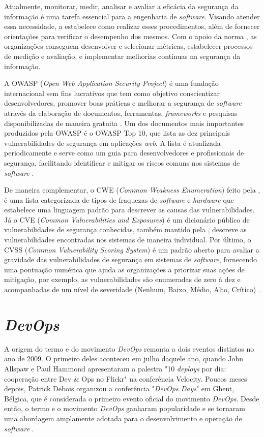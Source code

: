 Atualmente, monitorar, medir, analisar e avaliar a eficácia da segurança da informação é uma tarefa essencial para a engenharia de \textit{software}. Visando atender essa necessidade, a  estabelece como realizar esses procedimentos, além de fornecer orientações para verificar o desempenho dos mesmos. Com o apoio da norma , as organizações conseguem desenvolver e selecionar métricas, estabelecer processos de medição e avaliação, e implementar melhorias contínuas na segurança da informação.

A OWASP (\textit{Open Web Application Security Project}) é uma fundação internacional sem fins lucrativos que tem como objetivo conscientizar desenvolvedores, promover boas práticas e melhorar a segurança de \textit{software} através da elaboração de documentos, ferramentas, \textit{frameworks} e pesquisas disponibilizadas de maneira gratuita \cite{owasp}. Um dos documentos mais importantes produzidos pela OWASP é o OWASP Top 10, que lista as dez principais vulnerabilidades de segurança em aplicações \textit{web}. A lista é atualizada periodicamente e serve como um guia para desenvolvedores e profissionais de segurança, facilitando identificar e mitigar os riscos comuns nos sistemas de \textit{software} \cite{owasptop10_2021}.


De maneira complementar, o CWE (\textit{Common Weakness Enumeration}) feito pela , é uma lista categorizada de tipos de fraquezas de \textit{software} e \textit{hardware} que estabelece uma linguagem padrão para descrever as causas das vulnerabilidades. Já o CVE (\textit{Common Vulnerabilities and Exposures}) é um dicionário público de vulnerabilidades de segurança conhecidas, também mantido pela \cite{CVE}, descreve as vulnerabilidades encontradas nos sistemas de maneira individual. 
Por último, o CVSS (\textit{Common Vulnerability Scoring System}) é um padrão aberto para avaliar a gravidade das vulnerabilidades de segurança em sistemas de \textit{software}, fornecendo uma pontuação numérica que ajuda as organizações a priorizar suas ações de mitigação, por exemplo, as vulnerabilidades são enumeradas de zero à dez e acompanhadas de um nível de severidade (Nenhum, Baixo, Médio, Alto, Crítico) \cite{CVSS}.


\section{\textit{DevOps}}

A origem do termo e do movimento \textit{DevOps} remonta a dois eventos distintos no ano de 2009. O primeiro deles aconteceu em julho daquele ano, quando John Allspaw e Paul Hammond apresentaram a palestra "10 \textit{deploys} por dia: cooperação entre Dev \& Ops no Flickr" na conferência Velocity. 
Poucos meses depois, Patrick Debois organizou a conferência "\textit{DevOps Days}" em Ghent, Bélgica, que é considerada o primeiro evento oficial do movimento \textit{DevOps}. Desde então, o termo e o movimento \textit{DevOps} ganharam popularidade e se tornaram uma abordagem amplamente adotada para o desenvolvimento e operação de \textit{software} \cite{DORA2024}.

